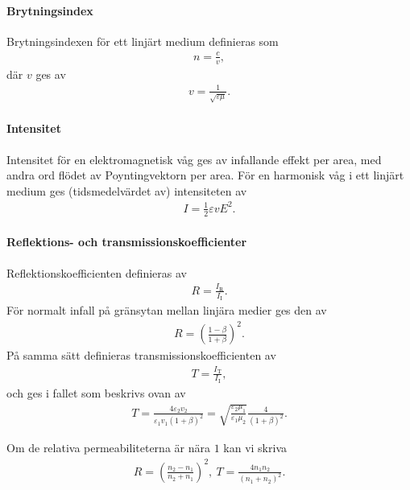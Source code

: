 \paragraph{Brytningsindex}
Brytningsindexen för ett linjärt medium definieras som
\begin{align*}
	n = \frac{c}{v},
\end{align*}
där $v$ ges av
\begin{align*}
	v = \frac{1}{\sqrt{\varepsilon\mu}}.
\end{align*}

\paragraph{Intensitet}
Intensitet för en elektromagnetisk våg ges av infallande effekt per area, med andra ord flödet av Poyntingvektorn per area. För en harmonisk våg i ett linjärt medium ges (tidsmedelvärdet av) intensiteten av
\begin{align*}
	I = \frac{1}{2}\varepsilon vE^{2}.
\end{align*}

\paragraph{Reflektions- och transmissionskoefficienter}
Reflektionskoefficienten definieras av
\begin{align*}
	R = \frac{I_{\text{R}}}{I_{\text{I}}}.
\end{align*}
För normalt infall på gränsytan mellan linjära medier ges den av
\begin{align*}
	R = \left(\frac{1 - \beta}{1 + \beta}\right)^{2}.
\end{align*}
På samma sätt definieras transmissionskoefficienten av
\begin{align*}
	T = \frac{I_{\text{T}}}{I_{\text{I}}},
\end{align*}
och ges i fallet som beskrivs ovan av
\begin{align*}
	T = \frac{4\varepsilon_{2}v_{2}}{\varepsilon_{1}v_{1}(1 + \beta)^{2}} = \sqrt{\frac{\varepsilon_{2}\mu_{1}}{\varepsilon_{1}\mu_{2}}}\frac{4}{(1 + \beta)^{2}}.
\end{align*}

Om de relativa permeabiliteterna är nära $1$ kan vi skriva
\begin{align*}
	R = \left(\frac{n_{2} - n_{1}}{n_{2} + n_{1}}\right)^{2},\ T = \frac{4n_{1}n_{2}}{(n_{1} + n_{2})^{2}}.
\end{align*}

